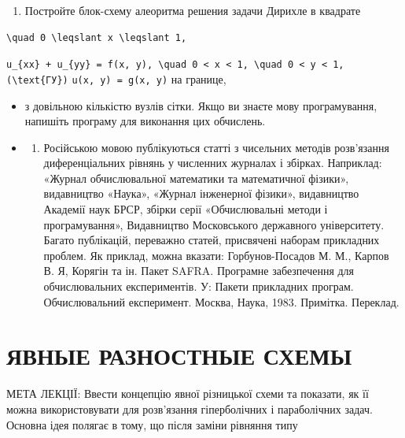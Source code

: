 \documentclass[
  ukrainian,
]{article}
\providecommand{\tightlist}{%
  \setlength{\itemsep}{0pt}\setlength{\parskip}{0pt}}
\begin{document}
\begin{enumerate}
\def\labelenumi{\arabic{enumi}.}
\setcounter{enumi}{5}
\tightlist
\item
  Постройте блок-схему алеоритма решения задачи Дирихле в квадрате
\end{enumerate}

\begin{verbatim}
\quad 0 \leqslant x \leqslant 1,
\end{verbatim}

\texttt{u\_\{xx\}\ +\ u\_\{yy\}\ =\ f(x,\ y),\ \textbackslash{}quad\ 0\ \textless{}\ x\ \textless{}\ 1,\ \textbackslash{}quad\ 0\ \textless{}\ y\ \textless{}\ 1,}
\texttt{(\textbackslash{}text\{ГУ\})} \texttt{u(x,\ y)\ =\ g(x,\ y)} на
границе,

\begin{itemize}
\tightlist
\item
  з довільною кількістю вузлів сітки. Якщо ви знаєте мову програмування,
  напишіть програму для виконання цих обчислень.
\item
  \begin{enumerate}
  \def\labelenumi{\arabic{enumi})}
  \tightlist
  \item
    Російською мовою публікуються статті з чисельних методів розв'язання
    диференціальних рівнянь у численних журналах і збірках. Наприклад:
    «Журнал обчислювальної математики та математичної фізики»,
    видавництво «Наука», «Журнал інженерної фізики», видавництво
    Академії наук БРСР, збірки серії «Обчислювальні методи і
    програмування», Видавництво Московського державного університету.
    Багато публікацій, переважно статей, присвячені наборам прикладних
    проблем. Як приклад, можна вказати: Горбунов-Посадов М. М., Карпов
    В. Я, Корягін та ін. Пакет SAFRA. Програмне забезпечення для
    обчислювальних експериментів. У: Пакети прикладних програм.
    Обчислювальний експеримент. Москва, Наука, 1983. Примітка. Переклад.
  \end{enumerate}
\end{itemize}

\section{ЯВНЫЕ РАЗНОСТНЫЕ
СХЕМЫ}\label{ux44fux432ux43dux44bux435-ux440ux430ux437ux43dux43eux441ux442ux43dux44bux435-ux441ux445ux435ux43cux44b}

МЕТА ЛЕКЦІЇ: Ввести концепцію явної різницької схеми та показати, як її
можна використовувати для розв'язання гіперболічних і параболічних
задач. Основна ідея полягає в тому, що після заміни рівняння типу
\end{document}
